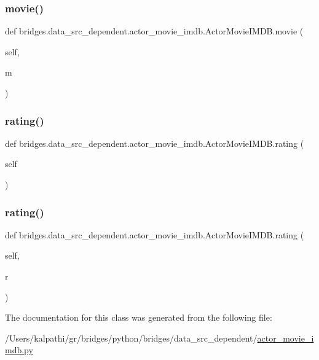 \subsubsection{\texorpdfstring{movie()}{movie()}\hspace{0.1cm}{\footnotesize\ttfamily [2/2]}}
{\footnotesize\ttfamily def bridges.\+data\+\_\+src\+\_\+dependent.\+actor\+\_\+movie\+\_\+imdb.\+Actor\+Movie\+I\+M\+D\+B.\+movie (\begin{DoxyParamCaption}\item[{}]{self,  }\item[{}]{m }\end{DoxyParamCaption})}

\mbox{\label{classbridges_1_1data__src__dependent_1_1actor__movie__imdb_1_1_actor_movie_i_m_d_b_a38ab0b7ab41a2c2c31111264de3952cb}} 
\subsubsection{\texorpdfstring{rating()}{rating()}\hspace{0.1cm}{\footnotesize\ttfamily [1/2]}}
{\footnotesize\ttfamily def bridges.\+data\+\_\+src\+\_\+dependent.\+actor\+\_\+movie\+\_\+imdb.\+Actor\+Movie\+I\+M\+D\+B.\+rating (\begin{DoxyParamCaption}\item[{}]{self }\end{DoxyParamCaption})}

\mbox{\label{classbridges_1_1data__src__dependent_1_1actor__movie__imdb_1_1_actor_movie_i_m_d_b_a72585e9e7ad9d2d2409cbd4f6fb92fcc}} 
\subsubsection{\texorpdfstring{rating()}{rating()}\hspace{0.1cm}{\footnotesize\ttfamily [2/2]}}
{\footnotesize\ttfamily def bridges.\+data\+\_\+src\+\_\+dependent.\+actor\+\_\+movie\+\_\+imdb.\+Actor\+Movie\+I\+M\+D\+B.\+rating (\begin{DoxyParamCaption}\item[{}]{self,  }\item[{}]{r }\end{DoxyParamCaption})}



The documentation for this class was generated from the following file\+:\begin{DoxyCompactItemize}
\item 
/\+Users/kalpathi/gr/bridges/python/bridges/data\+\_\+src\+\_\+dependent/\mbox{\hyperlink{actor__movie__imdb_8py}{actor\+\_\+movie\+\_\+imdb.\+py}}\end{DoxyCompactItemize}
